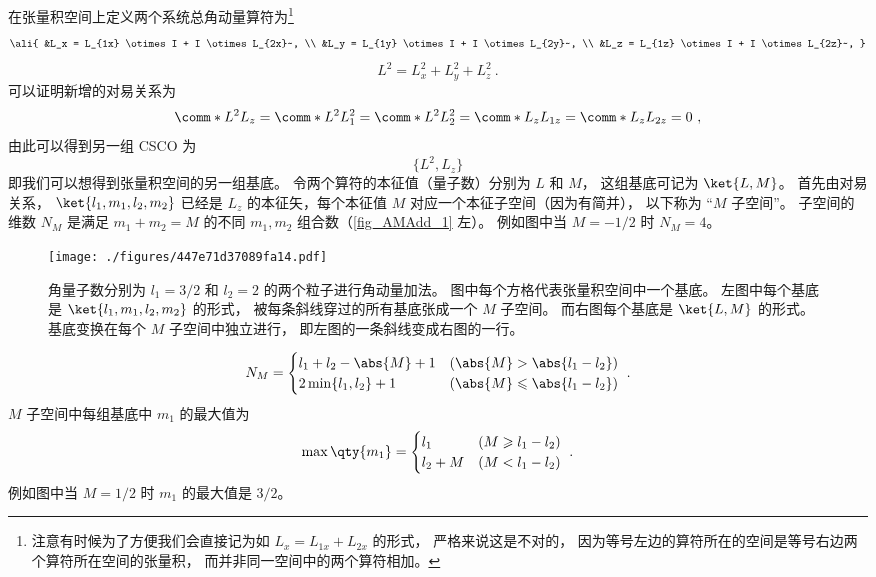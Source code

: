 在张量积空间上定义两个系统总角动量算符为\footnote{注意有时候为了方便我们会直接记为如 $L_x = L_{1x} + L_{2x}$ 的形式， 严格来说这是不对的， 因为等号左边的算符所在的空间是等号右边两个算符所在空间的张量积， 而并非同一空间中的两个算符相加。}
\begin{equation}\ali{
&L_x = L_{1x} \otimes I +  I \otimes L_{2x}~, \\
&L_y = L_{1y} \otimes I +  I \otimes L_{2y}~, \\
&L_z = L_{1z} \otimes I +  I \otimes L_{2z}~,
}\end{equation}
\begin{equation}
L^2 = L_x^2 + L_y^2 + L_z^2~.
\end{equation}
可以证明新增的对易关系为
\begin{equation}
\comm*{L^2}{L_z} = \comm*{L^2}{L_1^2} = \comm*{L^2}{L_2^2} = 
\comm*{L_z}{L_{1z}} = \comm*{L_z}{L_{2z}} = 0~,
\end{equation}
由此可以得到另一组 CSCO 为 %
\begin{equation}
\{L^2, L_z\}
\end{equation}
即我们可以想得到张量积空间的另一组基底。 令两个算符的本征值（量子数）分别为 $L$  和 $M$， 这组基底可记为 $\ket{L, M}$。  首先由对易关系， $\ket{l_1, m_1, l_2, m_2}$ 已经是 $L_z$ 的本征矢，每个本征值 $M$ 对应一个本征子空间（因为有简并）， 以下称为 “$M$ 子空间”。 子空间的维数 $N_M$ 是满足 $m_1 + m_2 = M$ 的不同 $m_1,m_2$ 组合数（\autoref{fig_AMAdd_1} 左）。 例如图中当 $M = -1/2$ 时 $N_M = 4$。
\begin{figure}[ht]
\centering
\texttt{[image: ./figures/447e71d37089fa14.pdf]}
\caption{角量子数分别为 $l_1 = 3/2$ 和 $l_2 = 2$ 的两个粒子进行角动量加法。 图中每个方格代表张量积空间中一个基底。 左图中每个基底是 $\ket{l_1, m_1, l_2, m_2}$ 的形式， 被每条斜线穿过的所有基底张成一个 $M$ 子空间。 而右图每个基底是 $\ket{L, M}$ 的形式。 基底变换在每个 $M$ 子空间中独立进行， 即左图的一条斜线变成右图的一行。} \label{fig_AMAdd_1}
\end{figure}

\begin{equation}
N_M =
\begin{cases}
l_1 + l_2 - \abs{M} + 1 &(\abs{M} > \abs{l_1 - l_2}) \\
2\min\{l_1, l_2\}  + 1   &(\abs{M} \leqslant\abs{l_1 - l_2})
\end{cases}~.
\end{equation}
$M$ 子空间中每组基底中 $m_1$ 的最大值为
\begin{equation}
\max \qty{m_1} =
\begin{cases}
l_1 \quad &(M \geqslant l_1 - l_2)  \\
l_2 + M &(M < l_1 - l_2)
\end{cases}~.
\end{equation}
例如图中当 $M = 1/2$ 时 $m_1$ 的最大值是 $3/2$。

